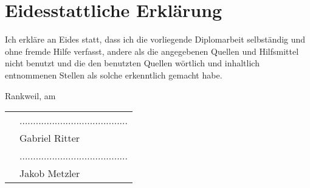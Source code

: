 \section*{Eidesstattliche Erklärung}
Ich erkläre an Eides statt, dass ich die vorliegende Diplomarbeit selbständig und ohne fremde
Hilfe verfasst, andere als die angegebenen Quellen und Hilfsmittel nicht benutzt und die den
benutzten Quellen wörtlich und inhaltlich entnommenen Stellen als solche erkenntlich
gemacht habe.

\vspace{0.3cm}
Rankweil, am 
\linebreak
\linebreak

\begin{tabular}{ll}
	& ........................................ \\
	& Gabriel Ritter  \\ [2.5em]
	& ........................................ \\
	& Jakob Metzler  \\ [2.5em]
\end{tabular}
